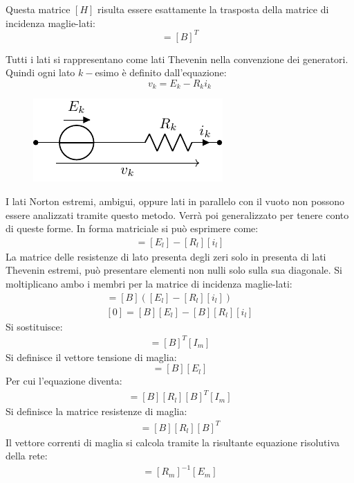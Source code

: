 \documentclass{article}
\numberwithin{equation}{subsection}
\begin{document}
Questa matrice $[H]$ risulta essere esattamente la trasposta della matrice di incidenza maglie-lati:
\begin{equation*}
    [H]=[B]^T
\end{equation*}

Tutti i lati si rappresentano come lati Thevenin nella convenzione dei generatori. Quindi ogni lato $k-$esimo è definito dall'equazione:
\begin{equation*}
    v_k=E_k-R_ki_k
\end{equation*}
\begin{figure}[H]%
    \centering
    \includegraphics{lato-thevenin-generico.pdf}
    \label{fig:lato-thevenin-generico}
\end{figure}
I lati Norton estremi, ambigui, oppure lati in parallelo con il vuoto non possono essere analizzati tramite questo metodo. Verrà poi generalizzato per tenere conto di queste 
forme. In forma matriciale si può esprimere come:
\begin{gather*}
    [v_l]=[E_l]-[R_l][i_l]
\end{gather*}
La matrice delle resistenze di lato presenta degli zeri solo in presenta di lati Thevenin estremi, può presentare elementi non nulli solo sulla sua diagonale. 
Si moltiplicano ambo i membri per la matrice di incidenza maglie-lati:
\begin{gather*}
    [B][v_l]=[B]\left([E_l]-[R_l][i_l]\right)\\
    [0]=[B][E_l]-[B][R_l][i_l]
\end{gather*}
Si sostituisce:
\begin{gather*}
    [i_l]=[B]^T[I_m]
\end{gather*}
Si definisce il vettore tensione di maglia:
\begin{equation*}
    [E_m]=[B][E_l]
\end{equation*}
Per cui l'equazione diventa:
\begin{gather*}
    [E_m]=[B][R_l][B]^T[I_m]
\end{gather*}
Si definisce la matrice resistenze di maglia:
\begin{gather*}
    [R_m]=[B][R_l][B]^T
\end{gather*}
Il vettore correnti di maglia si calcola tramite la risultante equazione risolutiva della rete:
\begin{gather*}
    [I_m]=[R_m]^{-1}[E_m]
\end{gather*}
\end{document}
